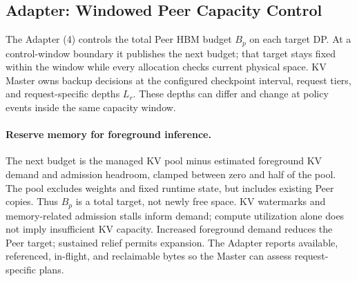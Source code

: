 \subsection{Adapter: Windowed Peer Capacity Control}
\label{sec:kv-runtime}
\label{sec:capacity-allocation}

The Adapter (4) controls the total Peer HBM budget $B_p$ on each
target DP. At a control-window boundary it publishes the next budget;
that target stays fixed within the window while every allocation checks
current physical space. KV Master owns backup decisions at the configured
checkpoint interval, request tiers,
and request-specific depths $L_r$. These depths can differ and change
at policy events inside the same capacity window.

\paragraph{Reserve memory for foreground inference.}
The next budget is the managed KV pool minus estimated foreground
KV demand and admission headroom, clamped between zero and half of
the pool. The pool excludes weights and fixed runtime state, but includes
existing Peer copies. Thus $B_p$ is a total target, not newly free space.
KV watermarks and memory-related admission stalls inform demand;
compute utilization alone does not imply insufficient KV capacity.
Increased foreground demand reduces the Peer target; sustained relief
permits expansion. The Adapter reports available, referenced, in-flight,
and reclaimable bytes so the Master can assess request-specific plans.

